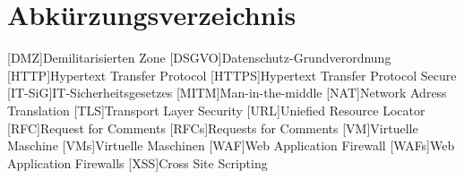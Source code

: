 \tableofcontents
\pagebreak

\section{Abkürzungsverzeichnis}

\begin{acronym}
    [DMZ]{Demilitarisierten Zone}
    [DSGVO]{Datenschutz-Grundverordnung}
    [HTTP]{Hypertext Transfer Protocol}
    [HTTPS]{Hypertext Transfer Protocol Secure}
    [IT-SiG]{IT-Sicherheitsgesetzes}
    [MITM]{Man-in-the-middle}
    [NAT]{Network Adress Translation}
    [TLS]{Transport Layer Security}
    [URL]{Uniefied Resource Locator}
    [RFC]{Request for Comments}
    [RFCs]{Requests for Comments}
    [VM]{Virtuelle Maschine}
    [VMs]{Virtuelle Maschinen}
    [WAF]{Web Application Firewall}
    [WAFs]{Web Application Firewalls}
    [XSS]{Cross Site Scripting}
\end{acronym}

\pagebreak

\listoffigures

\pagebreak
